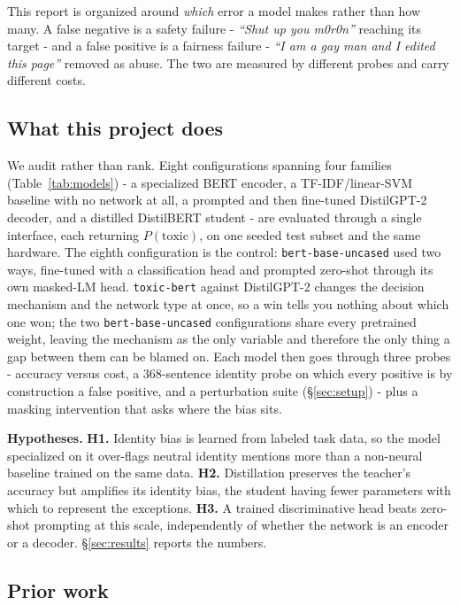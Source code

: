 \documentclass[10pt,a4paper]{article}
\begin{document}
This report is organized around \emph{which} error a model makes rather than how many. A
false negative is a safety failure - \emph{``Shut up you m0r0n''} reaching its target - and
a false positive is a fairness failure - \emph{``I am a gay man and I edited this page''}
removed as abuse. The two are measured by different probes and carry different costs.
\subsection{What this project does}
\label{sec:overview}

We audit rather than rank. Eight configurations spanning four families
(Table~\ref{tab:models}) - a specialized BERT encoder, a TF-IDF/linear-SVM baseline with
no network at all, a prompted and then fine-tuned DistilGPT-2 decoder, and a distilled
DistilBERT student - are evaluated through a single interface, each returning
$P(\text{toxic})$, on one seeded test subset and the same hardware. The eighth
configuration is the control: \texttt{bert-base-uncased} used two ways, fine-tuned with a
classification head and prompted zero-shot through its own masked-LM head.
\texttt{toxic-bert} against DistilGPT-2 changes the decision mechanism and the network
type at once, so a win tells you nothing about which one won; the two
\texttt{bert-base-uncased} configurations share every pretrained weight, leaving the
mechanism as the only variable and therefore the only thing a gap between them can be
blamed on. Each model then goes through three probes - accuracy versus cost, a
368-sentence identity probe on which every positive is by construction a false positive,
and a perturbation suite (\S\ref{sec:setup}) - plus a masking intervention that asks
where the bias sits.

\textbf{Hypotheses.} \textbf{H1.} Identity bias is learned from labeled task data, so the
model specialized on it over-flags neutral identity mentions more than a non-neural
baseline trained on the same data. \textbf{H2.} Distillation preserves the teacher's
accuracy but amplifies its identity bias, the student having fewer parameters with which
to represent the exceptions. \textbf{H3.} A trained discriminative head beats zero-shot
prompting at this scale, independently of whether the network is an encoder or a decoder.
\S\ref{sec:results} reports the numbers.

\subsection{Prior work}
\end{document}
